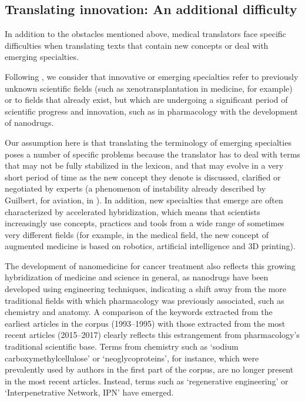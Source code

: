 \documentclass[output=paper]{langscibook}
\begin{document}
\subsection{Translating innovation: An additional difficulty}\label{sec:cuchet:1.2}

In addition to the obstacles mentioned above, medical translators face specific difficulties when translating texts that contain new concepts or deal with emerging specialties.

Following \citet{Kuhn1970}, we consider that innovative or emerging specialties refer to previously unknown scientific fields (such as xenotransplantation in medicine, for example) or to fields that already exist, but which are undergoing a significant period of scientific progress and innovation, such as in pharmacology with the development of nanodrugs.

Our assumption here is that translating the terminology of emerging specialties poses a number of specific problems because the translator has to deal with terms that may not be fully stabilized in the lexicon, and that may evolve in a very short period of time as the new concept they denote is discussed, clarified or negotiated by experts (a phenomenon of instability already described by Guilbert, for aviation, in \citeyear{Guilbert1965}). In addition, new specialties that emerge are often characterized by accelerated hybridization, which means that scientists increasingly use concepts, practices and tools from a wide range of sometimes very different fields (for example, in the medical field, the new concept of augmented medicine is based on robotics, artificial intelligence and 3D printing).

The development of nanomedicine for cancer treatment also reflects this growing hybridization of medicine and science in general, as nanodrugs have been developed using engineering techniques, indicating a shift away from the more traditional fields with which pharmacology was previously associated, such as chemistry and anatomy. A comparison of the keywords extracted from the earliest articles in the corpus (1993–1995) with those extracted from the most recent articles (2015–2017) clearly reflects this estrangement from pharmacology’s traditional scientific base. Terms from chemistry such as ‘sodium carboxymethylcellulose’ or ‘neoglycoproteins’, for instance, which were prevalently used by authors in the first part of the corpus, are no longer present in the most recent articles. Instead, terms such as ‘regenerative engineering’ or ‘Interpenetrative Network, IPN’ have emerged.
\end{document}
